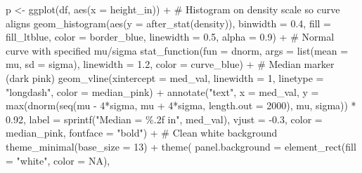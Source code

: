 \documentclass[
  letterpaper,
  DIV=11,
  numbers=noendperiod]{scrreprt}
\newenvironment{Shaded}{\begin{snugshade}}{\end{snugshade}}
\newcommand{\AttributeTok}[1]{\textcolor[rgb]{0.40,0.45,0.13}{#1}}
\newcommand{\CommentTok}[1]{\textcolor[rgb]{0.37,0.37,0.37}{#1}}
\newcommand{\ConstantTok}[1]{\textcolor[rgb]{0.56,0.35,0.01}{#1}}
\newcommand{\DecValTok}[1]{\textcolor[rgb]{0.68,0.00,0.00}{#1}}
\newcommand{\FloatTok}[1]{\textcolor[rgb]{0.68,0.00,0.00}{#1}}
\newcommand{\FunctionTok}[1]{\textcolor[rgb]{0.28,0.35,0.67}{#1}}
\newcommand{\NormalTok}[1]{\textcolor[rgb]{0.00,0.23,0.31}{#1}}
\newcommand{\OtherTok}[1]{\textcolor[rgb]{0.00,0.23,0.31}{#1}}
\newcommand{\SpecialCharTok}[1]{\textcolor[rgb]{0.37,0.37,0.37}{#1}}
\newcommand{\StringTok}[1]{\textcolor[rgb]{0.13,0.47,0.30}{#1}}
\begin{document}
\begin{Shaded}
\begin{Highlighting}[]
\NormalTok{p }\OtherTok{\textless{}{-}} \FunctionTok{ggplot}\NormalTok{(df, }\FunctionTok{aes}\NormalTok{(}\AttributeTok{x =}\NormalTok{ height\_in)) }\SpecialCharTok{+}
  \CommentTok{\# Histogram on density scale so curve aligns}
  \FunctionTok{geom\_histogram}\NormalTok{(}\FunctionTok{aes}\NormalTok{(}\AttributeTok{y =} \FunctionTok{after\_stat}\NormalTok{(density)),}
                 \AttributeTok{binwidth =} \FloatTok{0.4}\NormalTok{,}
                 \AttributeTok{fill =}\NormalTok{ fill\_ltblue,}
                 \AttributeTok{color =}\NormalTok{ border\_blue,}
                 \AttributeTok{linewidth =} \FloatTok{0.5}\NormalTok{,}
                 \AttributeTok{alpha =} \FloatTok{0.9}\NormalTok{) }\SpecialCharTok{+}
  \CommentTok{\# Normal curve with specified mu/sigma}
  \FunctionTok{stat\_function}\NormalTok{(}\AttributeTok{fun =}\NormalTok{ dnorm,}
                \AttributeTok{args =} \FunctionTok{list}\NormalTok{(}\AttributeTok{mean =}\NormalTok{ mu, }\AttributeTok{sd =}\NormalTok{ sigma),}
                \AttributeTok{linewidth =} \FloatTok{1.2}\NormalTok{,}
                \AttributeTok{color =}\NormalTok{ curve\_blue) }\SpecialCharTok{+}
  \CommentTok{\# Median marker (dark pink)}
  \FunctionTok{geom\_vline}\NormalTok{(}\AttributeTok{xintercept =}\NormalTok{ med\_val,}
             \AttributeTok{linewidth =} \DecValTok{1}\NormalTok{,}
             \AttributeTok{linetype =} \StringTok{"longdash"}\NormalTok{,}
             \AttributeTok{color =}\NormalTok{ median\_pink) }\SpecialCharTok{+}
  \FunctionTok{annotate}\NormalTok{(}\StringTok{"text"}\NormalTok{,}
           \AttributeTok{x =}\NormalTok{ med\_val,}
           \AttributeTok{y =} \FunctionTok{max}\NormalTok{(}\FunctionTok{dnorm}\NormalTok{(}\FunctionTok{seq}\NormalTok{(mu }\SpecialCharTok{{-}} \DecValTok{4}\SpecialCharTok{*}\NormalTok{sigma, mu }\SpecialCharTok{+} \DecValTok{4}\SpecialCharTok{*}\NormalTok{sigma, }\AttributeTok{length.out =} \DecValTok{2000}\NormalTok{), mu, sigma)) }\SpecialCharTok{*} \FloatTok{0.92}\NormalTok{,}
           \AttributeTok{label =} \FunctionTok{sprintf}\NormalTok{(}\StringTok{"Median = \%.2f in"}\NormalTok{, med\_val),}
           \AttributeTok{vjust =} \SpecialCharTok{{-}}\FloatTok{0.3}\NormalTok{,}
           \AttributeTok{color =}\NormalTok{ median\_pink,}
           \AttributeTok{fontface =} \StringTok{"bold"}\NormalTok{) }\SpecialCharTok{+}
  \CommentTok{\# Clean white background}
  \FunctionTok{theme\_minimal}\NormalTok{(}\AttributeTok{base\_size =} \DecValTok{13}\NormalTok{) }\SpecialCharTok{+}
  \FunctionTok{theme}\NormalTok{(}
    \AttributeTok{panel.background   =} \FunctionTok{element\_rect}\NormalTok{(}\AttributeTok{fill =} \StringTok{"white"}\NormalTok{, }\AttributeTok{color =} \ConstantTok{NA}\NormalTok{),}

\end{Highlighting}
\end{Shaded}
\end{document}
